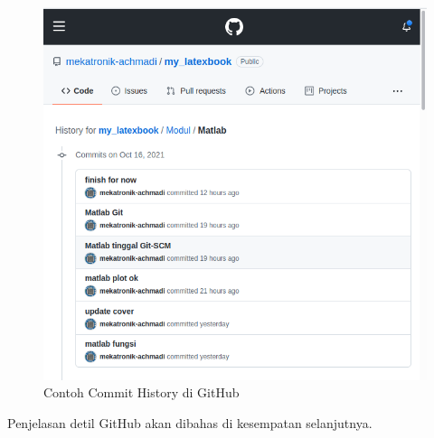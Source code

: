 \documentclass[12pt]{book}
\begin{document}
	\begin{figure}[!ht]
		\centering
		\includegraphics[width=400pt]{images/github0}
		\caption{Contoh Commit History di GitHub}
	\end{figure}
	
	Penjelasan detil GitHub akan dibahas di kesempatan selanjutnya.
	
\end{document}
